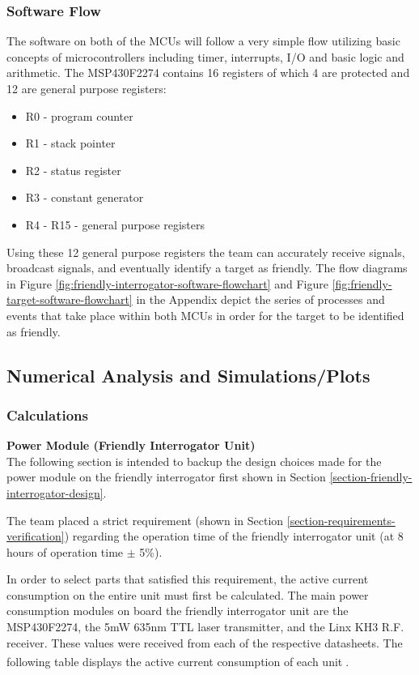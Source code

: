 \documentclass[letterpaper,10pt]{article}
\begin{document}
\begin{spacing}{1.15}
\subsubsection{Software Flow}
The software on both of the MCUs will follow a very simple flow utilizing basic concepts of microcontrollers including timer, interrupts, I/O and basic logic and arithmetic. The MSP430F2274 contains 16 registers of which 4 are protected and 12 are general purpose registers:
\begin{itemize}
	\item R0 - program counter
	\item R1 - stack pointer 
	\item R2 - status register
	\item R3 - constant generator
	\item R4 - R15 - general purpose registers
\end{itemize}
Using these 12 general purpose registers the team can accurately receive signals, broadcast signals, and eventually identify a target as friendly. The flow diagrams in Figure \ref*{fig:friendly-interrogator-software-flowchart} and Figure \ref*{fig:friendly-target-software-flowchart} in the Appendix depict the series of processes and events that take place within both MCUs in order for the target to be identified as friendly. 

\subsection{Numerical Analysis and Simulations/Plots} \label{section-simulations-calculations}
\subsubsection{Calculations}
\normalsize\textbf{Power Module (Friendly Interrogator Unit)} \\
The following section is intended to backup the design choices made for the power module on the friendly interrogator first shown in Section \ref{section-friendly-interrogator-design}.

The team placed a strict requirement (shown in Section \ref{section-requirements-verification}) regarding the operation time of the friendly interrogator unit (at 8 hours of operation time $\pm$ 5\%).

In order to select parts that satisfied this requirement, the active current consumption on the entire unit must first be calculated. The main power consumption modules on board the friendly interrogator unit are the MSP430F2274, the 5mW 635nm TTL laser transmitter, and the Linx KH3 R.F. receiver. These values were received from each of the respective datasheets. The following table displays the active current consumption of each unit\textsuperscript{\cite{MSP430F2274} \cite{Linx-Receiver} \cite{Laser}}. 



\end{spacing}
\end{document}
